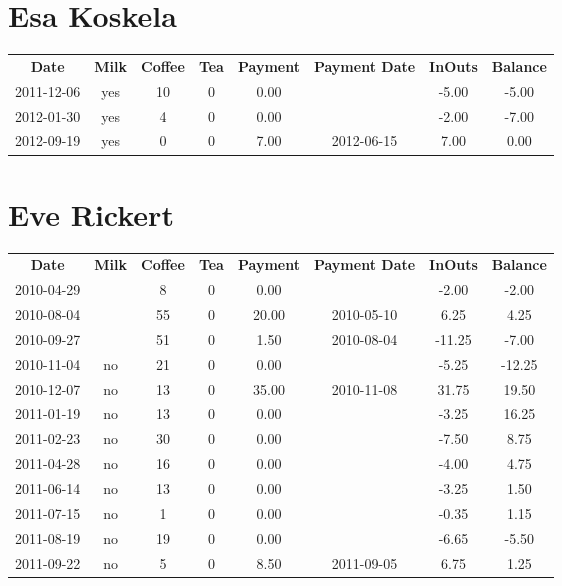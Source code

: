 \section{Esa Koskela}

\begin{center}
\begin{tabular}{cccccccc}
\textbf{Date} & \textbf{Milk} & \textbf{Coffee} & \textbf{Tea} & \textbf{Payment} & \textbf{Payment Date} & \textbf{InOuts} & \textbf{Balance} \\
2011-12-06 & yes & 10 & 0 & 0.00 &  & -5.00 & -5.00\\ 
2012-01-30 & yes &  4 & 0 & 0.00 &  & -2.00 & -7.00\\ 
2012-09-19 & yes &  0 & 0 & 7.00 & 2012-06-15 &  7.00 &  0.00
\end{tabular}
\end{center}

\section{Eve Rickert}

\begin{center}
\begin{tabular}{cccccccc}
\textbf{Date} & \textbf{Milk} & \textbf{Coffee} & \textbf{Tea} & \textbf{Payment} & \textbf{Payment Date} & \textbf{InOuts} & \textbf{Balance} \\
2010-04-29 &  &  8 & 0 &  0.00 &  &  -2.00 &  -2.00\\ 
2010-08-04 &  & 55 & 0 & 20.00 & 2010-05-10 &   6.25 &   4.25\\ 
2010-09-27 &  & 51 & 0 &  1.50 & 2010-08-04 & -11.25 &  -7.00\\ 
2010-11-04 & no & 21 & 0 &  0.00 &  &  -5.25 & -12.25\\ 
2010-12-07 & no & 13 & 0 & 35.00 & 2010-11-08 &  31.75 &  19.50\\ 
2011-01-19 & no & 13 & 0 &  0.00 &  &  -3.25 &  16.25\\ 
2011-02-23 & no & 30 & 0 &  0.00 &  &  -7.50 &   8.75\\ 
2011-04-28 & no & 16 & 0 &  0.00 &  &  -4.00 &   4.75\\ 
2011-06-14 & no & 13 & 0 &  0.00 &  &  -3.25 &   1.50\\ 
2011-07-15 & no &  1 & 0 &  0.00 &  &  -0.35 &   1.15\\ 
2011-08-19 & no & 19 & 0 &  0.00 &  &  -6.65 &  -5.50\\ 
2011-09-22 & no &  5 & 0 &  8.50 & 2011-09-05 &   6.75 &   1.25
\end{tabular}
\end{center}

